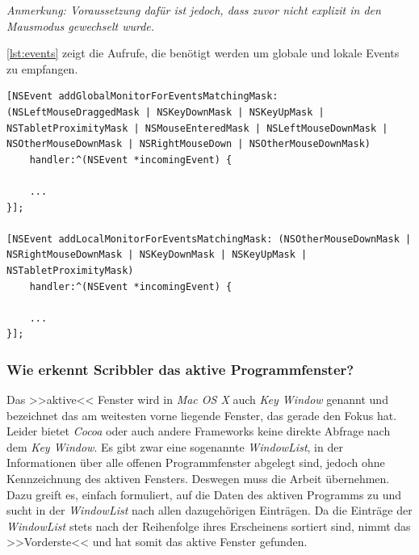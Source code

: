 \bigskip \emph{Anmerkung: \graffito{\(\clubsuit\)} Voraussetzung dafür ist jedoch, dass zuvor nicht explizit in den Mausmodus gewechselt wurde.}
\bigskip

\autoref{lst:events} zeigt die Aufrufe, die benötigt werden um globale und lokale Events zu empfangen.

\lstset{language=[Objective]C}
\begin{lstlisting}[float,caption=Global and Local Event Monitoring,label=lst:events]
[NSEvent addGlobalMonitorForEventsMatchingMask: (NSLeftMouseDraggedMask | NSKeyDownMask | NSKeyUpMask | NSTabletProximityMask | NSMouseEnteredMask | NSLeftMouseDownMask | NSOtherMouseDownMask | NSRightMouseDown | NSOtherMouseDownMask)
    handler:^(NSEvent *incomingEvent) {
	
    ...
}];	

[NSEvent addLocalMonitorForEventsMatchingMask: (NSOtherMouseDownMask | NSRightMouseDownMask | NSKeyDownMask | NSKeyUpMask | NSTabletProximityMask)
    handler:^(NSEvent *incomingEvent) {

    ...
}];	
\end{lstlisting}

\subsubsection* {Wie erkennt Scribbler das aktive Programmfenster?} 
Das >>aktive<< Fenster wird in \emph{Mac OS X} auch \emph{Key Window} genannt und bezeichnet das am weitesten vorne liegende Fenster, das gerade den Fokus hat. Leider bietet \emph{Cocoa} oder auch andere Frameworks keine direkte Abfrage nach dem \emph{Key Window}. Es gibt zwar eine sogenannte \emph{WindowList}, in der Informationen über alle offenen Programmfenster abgelegt sind, jedoch ohne Kennzeichnung des aktiven Fensters. Deswegen muss \scribbler die Arbeit übernehmen. \\
Dazu greift es, einfach formuliert, auf die Daten des aktiven Programms zu und sucht in der \emph{WindowList} nach allen dazugehörigen Einträgen. Da die Einträge der \emph{WindowList} stets nach der Reihenfolge ihres Erscheinens sortiert sind, nimmt \scribbler das >>Vorderste<< und hat somit das aktive Fenster gefunden.

